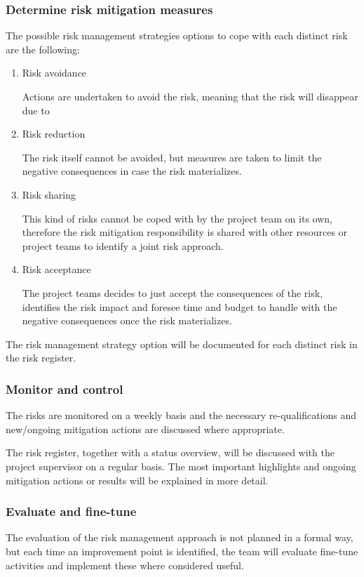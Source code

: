 \subsubsection{Determine risk mitigation measures}
The possible risk management strategies options to cope with each distinct risk are the following:
\begin{enumerate}
	\item Risk avoidance

	Actions are undertaken to avoid the risk, meaning that the risk will disappear due to 
	\item Risk reduction

	The risk itself cannot be avoided, but measures are taken to limit the negative consequences in case the risk materializes.
	\item Risk sharing

	This kind of risks cannot be coped with by the project team on its own, therefore the risk mitigation responsibility is shared with other resources or project teams to identify a joint risk approach.
	\item Risk acceptance

	The project teams decides to just accept the consequences of the risk, identifies the risk impact and foresee time and budget to handle with the negative consequences once the risk materializes.
\end {enumerate}

The risk management strategy option will be documented for each distinct risk in the risk register.

\subsubsection{Monitor and control}
The risks are monitored on a weekly basis and the necessary re-qualifications and new/ongoing mitigation actions are discussed where appropriate.

The risk register, together with a status overview, will be discussed with the project supervisor on a regular basis. 
The most important highlights and ongoing mitigation actions or results will be explained in more detail.

\subsubsection{Evaluate and fine-tune}
The evaluation of the risk management approach is not planned in a formal way, but each time an improvement point is identified, the team will evaluate fine-tune activities and implement these where considered useful.
